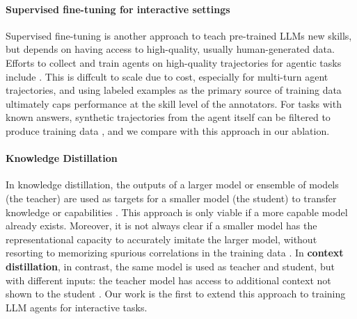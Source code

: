 \paragraph{Supervised fine-tuning for interactive settings} Supervised fine-tuning is another approach to teach pre-trained LLMs new skills, but depends on having access to high-quality, usually human-generated data. Efforts to collect and train agents on high-quality trajectories for agentic tasks include \citet{song2024agentbank}. This is diffcult to scale due to cost, especially for multi-turn agent trajectories, and using labeled examples as the primary source of training data ultimately caps performance at the skill level of the annotators. For tasks with known answers, synthetic trajectories from the agent itself can be filtered to produce training data \citep{yao2023react,xu2023rewoo}, and we compare with this approach in our ablation.

\paragraph{Knowledge Distillation}
In knowledge distillation, the outputs of a larger model or ensemble of models (the teacher) are used as targets for a smaller model (the student) to transfer knowledge or capabilities \citep{hinton2015distilling}. This approach is only viable if a more capable model already exists. Moreover, it is not always clear if a smaller model has the representational capacity to accurately imitate the larger model, without resorting to memorizing spurious correlations in the training data \citep{kim_comparing_2021}. In \textbf{context distillation}, in contrast, the same model is used as teacher and student, but with different inputs: the teacher model has access to additional context not shown to the student \citep{snell2022learning,padmanabhan2023propagating,kujanpaa2024knowledge,qi2025context}. Our work is the first to extend this approach to training LLM agents for interactive tasks.

